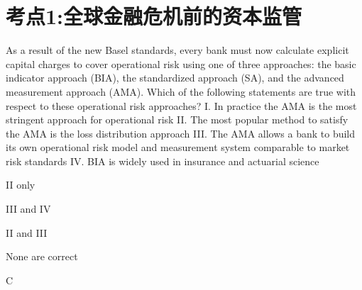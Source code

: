 \documentclass{article}
\newcounter{question} %
\begin{document}
 \tableofcontents %
\newpage




\section{考点1:全球金融危机前的资本监管}
\setcounter{question}{0}


\begin{question}
    As a result of the new Basel standards, every bank must now calculate explicit capital charges to cover operational risk using one of three approaches: the basic indicator approach (BIA), the standardized approach (SA), and the advanced measurement approach (AMA). Which of the following statements are true with respect to these operational risk approaches?
    I. In practice the AMA is the most stringent approach for operational risk
    II. The most popular method to satisfy the AMA is the loss distribution approach
    III. The AMA allows a bank to build its own operational risk model and measurement system comparable to market risk standards
    IV. BIA is widely used in insurance and actuarial science
\end{question}

\begin{choices}
    \item II only
    \item III and IV
    \item II and III
    \item None are correct
\end{choices}

\begin{correctanswer}
    C
\end{correctanswer}
\end{document}
